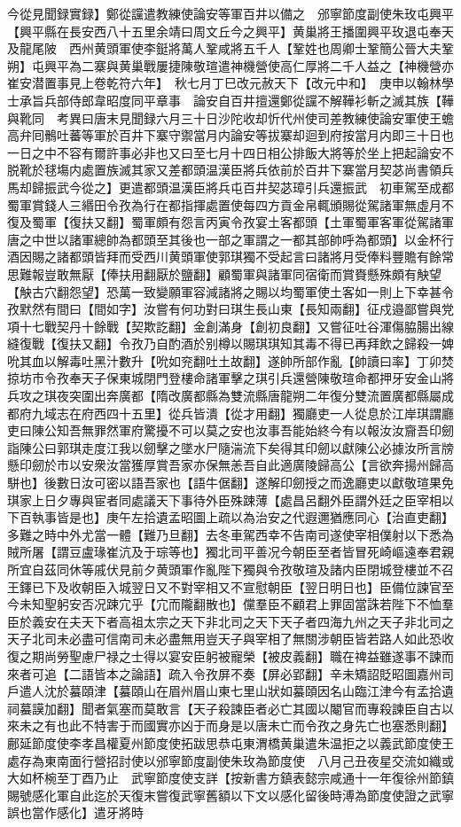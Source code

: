 今從見聞録實録】鄭從讜遣教練使論安等軍百井以備之　邠寧節度副使朱玫屯興平【興平縣在長安西八十五里余靖曰周文丘今之興平】黄巢將王播圍興平玫退屯奉天及龍尾陂　西州黄頭軍使李鋌將萬人鞏咸將五千人【鞏姓也周卿士鞏簡公晉大夫鞏朔】屯興平為二寨與黄巢戰屢捷陳敬瑄遣神機營使高仁厚將二千人益之【神機營亦崔安潜置事見上卷乾符六年】　秋七月丁巳改元赦天下【改元中和】　庚申以翰林學士承旨兵部侍郎韋昭度同平章事　論安自百井擅還鄭從讜不解鞾衫斬之滅其族【鞾與靴同　考異曰唐末見聞録六月三十日沙陀收却忻代州使司差教練使論安軍使王蟾高弁囘鶻吐蕃等軍於百井下寨守禦當月内論安等拔寨却迴到府按當月内即三十日也一日之中不容有爾許事必非也又曰至七月十四日相公排飯大將等於坐上把起論安不脱靴於毬塲内處置族滅其家又差都頭温漢臣將兵依前於百井下寨當月契苾尚書領兵馬却歸振武今從之】更遣都頭温漢臣將兵屯百井契苾璋引兵還振武　初車駕至成都蜀軍賞錢人三緡田令孜為行在都指揮處置使每四方貢金帛輒頒賜從駕諸軍無虛月不復及蜀軍【復扶又翻】蜀軍頗有怨言丙寅令孜宴土客都頭【土軍蜀軍客軍從駕諸軍唐之中世以諸軍總帥為都頭至其後也一部之軍謂之一都其部帥呼為都頭】以金杯行酒因賜之諸都頭皆拜而受西川黄頭軍使郭琪獨不受起言曰諸將月受俸料豐贍有餘常思難報豈敢無厭【俸扶用翻厭於鹽翻】顧蜀軍與諸軍同宿衛而賞賚懸殊頗有觖望【觖古穴翻怨望】恐萬一致變願軍容減諸將之賜以均蜀軍使土客如一則上下幸甚令孜默然有間曰【間如字】汝嘗有何功對曰琪生長山東【長知兩翻】征戍邉鄙嘗與党項十七戰契丹十餘戰【契欺訖翻】金創滿身【創初良翻】又嘗征吐谷渾傷脇腸出線縫復戰【復扶又翻】令孜乃自酌酒於别樽以賜琪琪知其毒不得已再拜飲之歸殺一婢吮其血以解毒吐黑汁數升【吮如兖翻吐土故翻】遂帥所部作亂【帥讀曰率】丁卯焚掠坊市令孜奉天子保東城閉門登樓命諸軍擊之琪引兵還營陳敬瑄命都押牙安金山將兵攻之琪夜突圍出奔廣都【隋改廣都縣為雙流縣唐龍朔二年復分雙流置廣都縣屬成都府九域志在府西四十五里】從兵皆潰【從才用翻】獨廳吏一人從息於江岸琪謂廳吏曰陳公知吾無罪然軍府驚擾不可以莫之安也汝事吾能始終今有以報汝汝齎吾印劒詣陳公曰郭琪走度江我以劒擊之墜水尸隨湍流下矣得其印劒以獻陳公必據汝所言牓懸印劒於市以安衆汝當獲厚賞吾家亦保無恙吾自此適廣陵歸高公【言欲奔揚州歸高駢也】後數日汝可密以語吾家也【語牛倨翻】遂解印劒授之而逸廳吏以獻敬瑄果免琪家上日夕專與宦者同處議天下事待外臣殊踈薄【處昌呂翻外臣謂外廷之臣宰相以下百執事皆是也】庚午左拾遺孟昭圖上疏以為治安之代遐邇猶應同心【治直吏翻】多難之時中外尤當一體【難乃旦翻】去冬車駕西幸不告南司遂使宰相僕射以下悉為賊所屠【謂豆盧瑑崔沆及于琮等也】獨北司平善况今朝臣至者皆冒死崎嶇遠奉君親所宜自茲同休等戚伏見前夕黄頭軍作亂陛下獨與令孜敬瑄及諸内臣閉城登樓並不召王鐸已下及收朝臣入城翌日又不對宰相又不宣慰朝臣【翌日明日也】臣備位諫官至今未知聖躬安否况踈宂乎【宂而隴翻散也】儻羣臣不顧君上罪固當誅若陛下不恤羣臣於義安在夫天下者高祖太宗之天下非北司之天下天子者四海九州之天子非北司之天子北司未必盡可信南司未必盡無用豈天子與宰相了無關涉朝臣皆若路人如此恐收復之期尚勞聖慮尸禄之士得以宴安臣躬被寵榮【被皮義翻】職在禆益雖遂事不諫而來者可追【二語皆本之論語】疏入令孜屏不奏【屏必郢翻】辛未矯詔貶昭圖嘉州司戶遣人沈於蟇頤津【蟇頤山在眉州眉山東七里山狀如蟇頤因名山臨江津今有孟拾遺祠蟇謨加翻】聞者氣塞而莫敢言【天子殺諫臣者必亡其國以閹官而專殺諫臣自古以來未之有也此不特害于而國實亦凶于而身是以唐未亡而令孜之身先亡也塞悉則翻】　鄜延節度使李孝昌權夏州節度使拓跋思恭屯東渭橋黄巢遣朱温拒之以義武節度使王處存為東南面行營招討使以邠寧節度副使朱玫為節度使　八月己丑夜星交流如織或大如杯椀至丁酉乃止　武寧節度使支詳【按新書方鎮表懿宗咸通十一年復徐州節鎮賜號感化軍自此迄於天復末嘗復武寧舊額以下文以感化留後時溥為節度使證之武寧誤也當作感化】遣牙將時